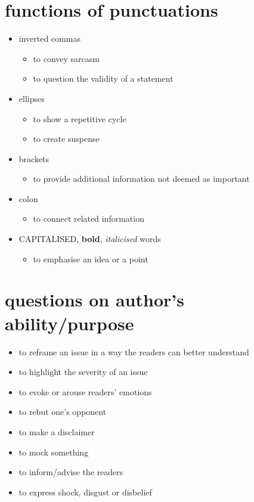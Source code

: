 \documentclass[a4paper]{article}
\begin{document}
\begin{CJK}{UTF8}{min}
\section{functions of punctuations}
\begin{itemize}
	\item inverted commas
		\begin{itemize}
			\item to convey sarcasm
			\item to question the validity of a statement
		\end{itemize}
	\item ellipses
		\begin{itemize}
			\item to show a repetitive cycle
			\item to create suspense
		\end{itemize}
	\item brackets
		\begin{itemize}
			\item to provide additional information not deemed as important
		\end{itemize}
	\item colon
		\begin{itemize}
			\item to connect related information
		\end{itemize}
	\item CAPITALISED, {\bf bold}, \emph{italicised} words
		\begin{itemize}
			\item to emphasise an idea or a point
		\end{itemize}
\end{itemize}

\section{questions on author's ability/purpose}
\begin{itemize}
	\item to reframe an issue in a way the readers can better understand
	\item to highlight the severity of an issue
	\item to evoke or arouse readers' emotions
	\item to rebut one's opponent
	\item to make a disclaimer
	\item to mock something
	\item to inform/advise the readers
	\item to express shock, disgust or disbelief
\end{itemize}


\end{CJK}
\end{document}
